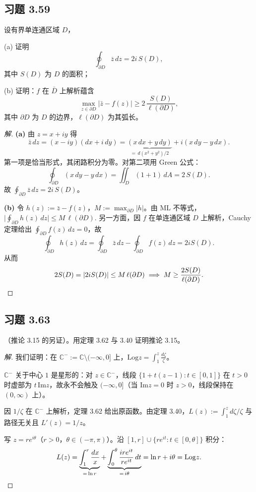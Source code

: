 \documentclass[11pt,a4paper]{article}
\newcommand{\C}{\mathbb{C}}
\renewcommand{\Im}{\mathrm{Im}}
\newcommand{\Log}{\mathrm{Log}}
\theoremstyle{definition}
\newenvironment{solution}{\begin{proof}[解]}{\end{proof}}
\begin{document}
\subsection{习题 3.59}

设有界单连通区域 $D$，

(a) 证明
\[
	\oint_{\partial D} \overline{z}\,dz = 2i\,S(D),
\]
其中 $S(D)$ 为 $D$ 的面积；

(b) 证明：$f$ 在 $\bar{D}$ 上解析蕴含
\[
	\max_{z\in\partial D} |\bar{z}-f(z)| \ge 2\,\frac{S(D)}{\ell(\partial D)},
\]
其中 $\partial D$ 为 $D$ 的边界，$\ell(\partial D)$ 为其弧长。

\begin{solution}
	\textbf{(a)}\;
	由 $z=x+iy$ 得
	\[
		\bar z\,dz
		=(x-iy)(dx+i\,dy)
		=\underbrace{(x\,dx+y\,dy)}_{=\,d(x^2+y^2)/2}
		+i(x\,dy-y\,dx).
	\]
	第一项是恰当形式，其闭路积分为零。对第二项用 Green 公式：
	\[
		\oint_{\partial D}(x\,dy-y\,dx)
		=\iint_D(1+1)\,dA=2\,S(D).
	\]
	故 $\oint_{\partial D}\bar z\,dz=2i\,S(D)$。

	\medskip

	\textbf{(b)}\;
	令 $h(z):=\bar z-f(z)$，$M:=\max_{\partial D}|h|$。由 ML 不等式，
	$\displaystyle\biggl|\oint_{\partial D}h(z)\,dz\biggr|
	\le M\,\ell(\partial D).$
	另一方面，因 $f$ 在单连通区域 $D$ 上解析，Cauchy 定理给出 $\oint_{\partial D}f(z)\,dz=0$，故
	\[
		\oint_{\partial D}h(z)\,dz
		=\oint_{\partial D}\bar z\,dz
		-\oint_{\partial D}f(z)\,dz
		=2iS(D).
	\]
	从而
	\[
		2S(D)=|2iS(D)|\le M\,\ell(\partial D)
		\implies
		M\ge\frac{2S(D)}{\ell(\partial D)}.\qedhere
	\]
\end{solution}

\subsection{习题 3.63}

（推论 3.15 的另证）。用定理 3.62 与 3.40 证明推论 3.15。

\begin{solution}
	我们证明：在 $\C^-:=\C\setminus(-\infty,0]$ 上，$\Log z=\int_1^z\frac{d\zeta}{\zeta}$。

	\smallskip

	$\C^-$ 关于中心 $1$ 是星形的：对 $z\in\C^-$，线段 $\{1+t(z-1):t\in[0,1]\}$ 在 $t>0$ 时虚部为 $t\,\Im z$，故永不会触及 $(-\infty,0]$（当 $\Im z=0$ 时 $z>0$，线段保持在 $(0,\infty)$ 上）。

	因 $1/\zeta$ 在 $\C^-$ 上解析，定理 3.62 给出原函数。由定理 3.40，$L(z):=\int_1^z d\zeta/\zeta$ 与路径无关且 $L'(z)=1/z$。

	写 $z=re^{i\theta}$（$r>0$，$\theta\in(-\pi,\pi)$）。沿 $[1,r]\cup\{re^{it}:t\in[0,\theta]\}$ 积分：
	\[
		L(z)
		=\underbrace{\int_1^r\frac{dx}{x}}_{=\,\ln r}
		+\underbrace{\int_0^\theta
		\frac{ire^{it}}{re^{it}}\,dt}_{=\,i\theta}
		=\ln r+i\theta
		=\Log z.\qedhere
	\]
\end{solution}
\end{document}
